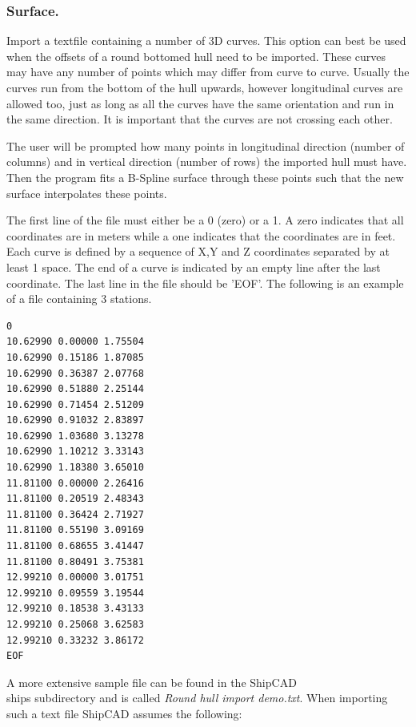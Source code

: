 \documentclass[12pt]{article}
\begin{document}
\subsubsection{Surface.}
Import a textfile containing a number of 3D curves. This option can
best be used when the offsets of a round bottomed hull need to be
imported. These curves may have any number of points which may differ
from curve to curve. Usually the curves run from the bottom of the
hull upwards, however longitudinal curves are allowed too, just as
long as all the curves have the same orientation and run in the same
direction. It is important that the curves are not crossing each
other.

The user will be prompted how many points in longitudinal direction
(number of columns) and in vertical direction (number of rows) the
imported hull must have. Then the program fits a B-Spline surface
through these points such that the new surface interpolates these
points.

The first line of the file must either be a 0 (zero) or a 1. A zero
indicates that all coordinates are in meters while a one indicates
that the coordinates are in feet. Each curve is defined by a sequence
of X,Y and Z coordinates separated by at least 1 space. The end of a
curve is indicated by an empty line after the last coordinate. The
last line in the file should be 'EOF'. The following is an example of
a file containing 3 stations.

\begin{verbatim}
0 
10.62990 0.00000 1.75504 
10.62990 0.15186 1.87085 
10.62990 0.36387 2.07768 
10.62990 0.51880 2.25144
10.62990 0.71454 2.51209 
10.62990 0.91032 2.83897 
10.62990 1.03680 3.13278 
10.62990 1.10212 3.33143 
10.62990 1.18380 3.65010 
11.81100 0.00000 2.26416 
11.81100 0.20519 2.48343 
11.81100 0.36424 2.71927 
11.81100 0.55190 3.09169 
11.81100 0.68655 3.41447 
11.81100 0.80491 3.75381 
12.99210 0.00000 3.01751 
12.99210 0.09559 3.19544 
12.99210 0.18538 3.43133 
12.99210 0.25068 3.62583 
12.99210 0.33232 3.86172 
EOF 
\end{verbatim}

A more extensive sample file can be found in the ShipCAD\\ships
subdirectory and is called \textit{Round hull import demo.txt}. When
importing such a text file ShipCAD assumes the following:
\end{document}
